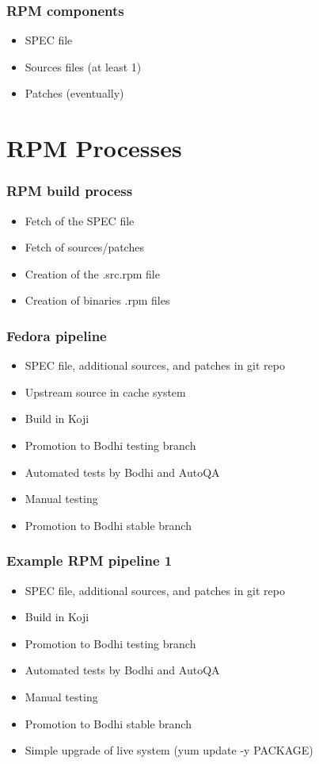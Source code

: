 \documentclass[t,aspectratio=169]{beamer}
\begin{document}
\begin{frame}
    \frametitle{RPM components}
    \begin{itemize}
        \item<2-> SPEC file
        \item<3-> Sources files (at least 1)
        \item<4-> Patches (eventually)
    \end{itemize}
\end{frame}

\section{RPM Processes}
\begin{frame}
    \frametitle{RPM build process}
    \begin{itemize}
        \item<2-> Fetch of the SPEC file
        \item<3-> Fetch of sources/patches
        \item<4-> Creation of the .src.rpm file
        \item<5-> Creation of binaries .rpm files
    \end{itemize}
\end{frame}

\begin{frame}
    \frametitle{Fedora pipeline}
    \begin{itemize}
        \item<2-> SPEC file, additional sources, and patches in git repo
        \item<3-> Upstream source in cache system
        \item<4-> Build in Koji
        \item<5-> Promotion to Bodhi testing branch
        \item<6-> Automated tests by Bodhi and AutoQA
        \item<7-> Manual testing
        \item<8-> Promotion to Bodhi stable branch
    \end{itemize}
\end{frame}

\begin{frame}
    \frametitle{Example RPM pipeline 1}
    \begin{itemize}
        \item<2-> SPEC file, additional sources, and patches in git repo
        \item<3-> Build in Koji
        \item<4-> Promotion to Bodhi testing branch
        \item<5-> Automated tests by Bodhi and AutoQA
        \item<6-> Manual testing
        \item<7-> Promotion to Bodhi stable branch
        \item<8-> Simple upgrade of live system (yum update -y PACKAGE)
    \end{itemize}
\end{frame}
\end{document}
